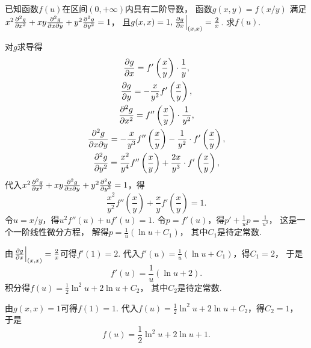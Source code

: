\begin{example}
已知函数\(f(u)\)在区间\((0,+\infty)\)内具有二阶导数，
函数\(g(x,y) = f(x/y)\)
满足\(x^2 \pdv[2]{g}{x} + xy \pdv[2]{g}{x}{y} + y^2 \pdv[2]{g}{y} = 1\)，
且\(g(x,x) = 1,
\eval{\pdv{g}{x}}_{(x,x)} = \frac2x\).
求\(f(u)\).
\begin{solution}
对\(g\)求导得\begin{gather*}
	\pdv{g}{x}
	= f'\left( \frac{x}{y} \right) \cdot \frac1y, \\
	\pdv{g}{y}
	= -\frac{x}{y^2} f'\left( \frac{x}{y} \right), \\
	\pdv[2]{g}{x}
	= f''\left( \frac{x}{y} \right) \cdot \frac1{y^2}, \\
	\pdv[2]{g}{x}{y}
	= -\frac{x}{y^3} f''\left( \frac{x}{y} \right) - \frac1{y^2} \cdot f'\left( \frac{x}{y} \right), \\
	\pdv[2]{g}{y}
	= \frac{x^2}{y^4} f''\left( \frac{x}{y} \right) + \frac{2x}{y^3} \cdot f'\left( \frac{x}{y} \right),
\end{gather*}
代入\(x^2 \pdv[2]{g}{x} + xy \pdv[2]{g}{x}{y} + y^2 \pdv[2]{g}{y} = 1\)，得\begin{equation*}
	\frac{x^2}{y^2} f''(\frac{x}{y}) + \frac{x}{y} f'\left( \frac{x}{y} \right) = 1.
\end{equation*}
令\(u=x/y\)，得\(u^2 f''(u) + u f'(u) = 1\).
令\(p=f'(u)\)，得\(p' + \frac1u p = \frac1{u^2}\)，
这是一个一阶线性微分方程，
解得\(p = \frac1u (\ln u + C_1)\)，
其中\(C_1\)是待定常数.

由\(\eval{\pdv{g}{x}}_{(x,x)} = \frac2x\)可得\(f'(1)=2\).
代入\(f'(u) = \frac1u (\ln u + C_1)\)，得\(C_1=2\)，
于是\begin{equation*}
	f'(u) = \frac1u (\ln u + 2).
\end{equation*}
积分得\(f(u) = \frac12 \ln^2 u + 2 \ln u + C_2\)，
其中\(C_2\)是待定常数.

由\(g(x,x) = 1\)可得\(f(1)=1\).
代入\(f(u) = \frac12 \ln^2 u + 2 \ln u + C_2\)，得\(C_2=1\)，
于是\begin{equation*}
	f(u) = \frac12 \ln^2 u + 2 \ln u + 1.
\end{equation*}
\end{solution}
\end{example}
